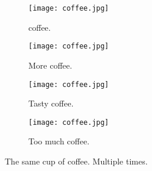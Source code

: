 \documentclass{article}
\begin{document}
	\begin{figure}[h!]
		\centering
		\begin{subfigure}[b]{0.2\linewidth}
			\texttt{[image: coffee.jpg]}
			\caption{coffee.}
		\end{subfigure}
		\begin{subfigure}[b]{0.2\linewidth}
	\texttt{[image: coffee.jpg]}
		\caption{More coffee.}
	\end{subfigure}
	\begin{subfigure}[b]{0.2\linewidth}
	\texttt{[image: coffee.jpg]}
	\caption{Tasty coffee.}
\end{subfigure}
	\begin{subfigure}[b]{0.5\linewidth}
	\texttt{[image: coffee.jpg]}
	\caption{Too much coffee.}
\end{subfigure}
\caption{The same cup of coffee. Multiple times.}
\label{fig:coffee}
	\end{figure}
\end{document}
